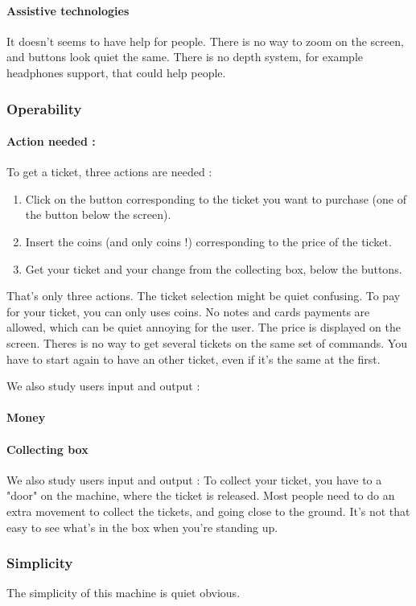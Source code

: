 \documentclass[a4paper,12pt]{article} %
\begin{document}
\paragraph{Assistive technologies} It doesn't seems to have help for people. There is no way to zoom on the screen, and buttons look quiet the same. There is no depth system, for example headphones support, that could help people.
\subsubsection{Operability}
\paragraph{Action needed : } To get a ticket, three actions are needed : 
\begin{enumerate}
\item Click on the button corresponding to the ticket you want to purchase (one of the button below the screen).
\item Insert the coins (and only coins !) corresponding to the price of the ticket.
\item Get your ticket and your change from the collecting box, below the buttons.
\end{enumerate}
That's only three actions. The ticket selection might be quiet confusing. To pay for your ticket, you can only uses coins. No notes and cards payments are allowed, which can be quiet annoying for the user. The price is displayed on the screen. Theres is no way to get several tickets on the same set of commands. You have to start again to have an other ticket, even if it's the same at the first.

We also study users input and output : 
\paragraph{Money}
\paragraph{Collecting box}
We also study users input and output : 
To collect your ticket, you have to a "door" on the machine, where the ticket is released. Most people need to do an extra movement to collect the tickets, and going close to the ground. It's not that easy to see what's in the box when you're standing up.

\subsubsection{Simplicity}
The simplicity of this machine is quiet obvious.
\end{document}
